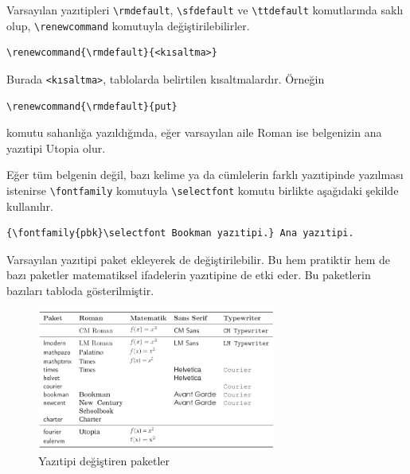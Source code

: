 \documentclass[
  letterpaper,
  DIV=11,
  numbers=noendperiod]{scrreprt}
\begin{document}
Varsayılan yazıtipleri \texttt{\textbackslash{}rmdefault},
\texttt{\textbackslash{}sfdefault} ve \texttt{\textbackslash{}ttdefault}
komutlarında saklı olup, \texttt{\textbackslash{}renewcommand} komutuyla
değiştirilebilirler.

\begin{verbatim}
\renewcommand{\rmdefault}{<kısaltma>}
\end{verbatim}

Burada \texttt{\textless{}kısaltma\textgreater{}}, tablolarda belirtilen
kısaltmalardır. Örneğin

\begin{verbatim}
\renewcommand{\rmdefault}{put}
\end{verbatim}

komutu sahanlığa yazıldığında, eğer varsayılan aile Roman ise belgenizin
ana yazıtipi Utopia olur.

Eğer tüm belgenin değil, bazı kelime ya da cümlelerin farklı yazıtipinde
yazılması istenirse \texttt{\textbackslash{}fontfamily} komutuyla
\texttt{\textbackslash{}selectfont} komutu birlikte aşağıdaki şekilde
kullanılır.

\begin{verbatim}
{\fontfamily{pbk}\selectfont Bookman yazıtipi.} Ana yazıtipi.
\end{verbatim}

Varsayılan yazıtipi paket ekleyerek de değiştirilebilir. Bu hem
pratiktir hem de bazı paketler matematiksel ifadelerin yazıtipine de
etki eder. Bu paketlerin bazıları tabloda gösterilmiştir.

\begin{figure}

{\centering \includegraphics[width=0.7\textwidth,height=\textheight]{./images/yazitipi6.png}

}

\caption{Yazıtipi değiştiren paketler}

\end{figure}
\end{document}
